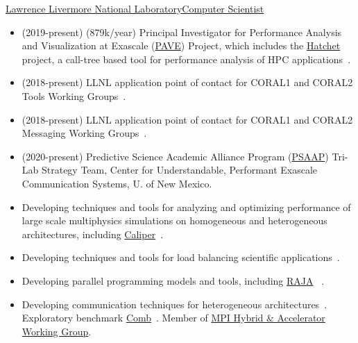 		{\href{http://www.llnl.gov}{Lawrence Livermore National Laboratory}}{\href{https://people.llnl.gov/pearce8}{Computer Scientist}}{}{}
		{\begin{itemize}
		  \item (2019-present) (879k/year) Principal Investigator for Performance Analysis and Visualization at Exascale
            (\href{https://computing.llnl.gov/projects/pave-performance-analysis-visualization-exascale}{PAVE}) Project,
            which includes the \href{https://hatchet.readthedocs.io/en/latest/}{Hatchet} project, a call-tree based tool
            for performance analysis of HPC applications~\cite{pearce:ProToolsSC20,pearce:vpa18,pearce:jowog20}.
		\item (2018-present) LLNL application point of contact for CORAL1 and CORAL2 Tools Working Groups~\cite{pearce:Coral2Mar20}.
		\item (2018-present) LLNL application point of contact for CORAL1 and CORAL2 Messaging Working Groups~\cite{pearce:sc19,pearce:ibm19,pearce:summitApr20,pearce:summitDec19,pearce:summitAug19}.
		\item (2020-present) Predictive Science Academic Alliance Program (\href{https://psaap.llnl.gov}{PSAAP}) Tri-Lab Strategy Team, 
			Center for Understandable, Performant Exascale Communication Systems, U. of New Mexico. 
		\item Developing techniques and tools for analyzing and optimizing performance of large scale multiphysics simulations on homogeneous and heterogeneous architectures,
          including \href{https://software.llnl.gov/Caliper/index.html}{Caliper}~\cite{boehme:sc16,pearce:salishan19,pearce:cascWIP19,pearce:necdc18,pearce:gtc18,pearce:jowog18}.
		\item Developing techniques and tools for load balancing scientific applications~\cite{pearce:fgcs18,pearce:sc16pmbs}.
		\item Developing parallel programming models and tools, including \href{https://raja.readthedocs.io/en/main/}{RAJA}
          ~\cite{beckingsale:ipdps17,pearce:p3hpc19,pearce:pc19,pearce:p2s218,pearce:gtc19,pearce:jowog19,pearce:coepp17,trilabL2:15}.
		\item Developing communication techniques for heterogeneous architectures~\cite{pearce:parco20}.
          Exploratory benchmark \href{https://github.com/LLNL/Comb}{Comb}~\cite{pearce:summitApr20,pearce:summitDec19,pearce:summitAug19}.
          Member of \href{https://github.com/mpiwg-hybrid/hybrid-issues}{MPI Hybrid \& Accelerator Working Group}.
		\end{itemize}}

